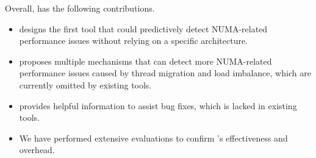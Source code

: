 Overall, \NP{} has the following contributions. 

\begin{itemize}
    \item \NP{} designs the first tool that could predictively detect NUMA-related performance issues without relying on a specific architecture. 
    \item \NP{} proposes multiple mechanisms that can detect more NUMA-related performance issues caused by thread migration and load imbalance, which are currently omitted by existing tools. 
    \item \NP{} provides helpful information to assist bug fixes, which is lacked in existing tools. 
    \item We have performed extensive evaluations to confirm \NP{}'s effectiveness and overhead.  
\end{itemize}

